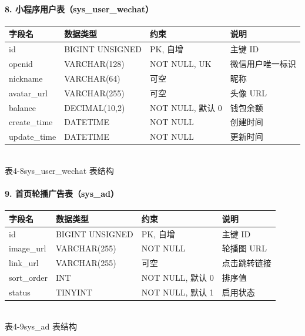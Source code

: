 \paragraph{8. 小程序用户表（sys\_user\_wechat）}
\begin{center}
  \renewcommand{\arraystretch}{1.4}
  \begin{tabular}{|>{\centering\arraybackslash}m{2.5cm}|>{\centering\arraybackslash}m{3.2cm}|>{\centering\arraybackslash}m{4.4cm}|>{\centering\arraybackslash}m{3.5cm}|}
    \hline
    \textbf{字段名} & \textbf{数据类型}   & \textbf{约束}    & \textbf{说明} \\ \hline
    id           & BIGINT UNSIGNED & PK, 自增         & 主键 ID       \\ \hline
    openid       & VARCHAR(128)    & NOT NULL, UK   & 微信用户唯一标识    \\ \hline
    nickname     & VARCHAR(64)     & 可空             & 昵称          \\ \hline
    avatar\_url  & VARCHAR(255)    & 可空             & 头像 URL      \\ \hline
    balance      & DECIMAL(10,2)   & NOT NULL, 默认 0 & 钱包余额        \\ \hline
    create\_time & DATETIME        & NOT NULL       & 创建时间        \\ \hline
    update\_time & DATETIME        & NOT NULL       & 更新时间        \\ \hline
  \end{tabular}
  \\[0.3em]
  {表4-8\quad sys\_user\_wechat 表结构}
\end{center}

\paragraph{9. 首页轮播广告表（sys\_ad）}
\begin{center}
  \renewcommand{\arraystretch}{1.4}
  \begin{tabular}{|>{\centering\arraybackslash}m{2.5cm}|>{\centering\arraybackslash}m{3.2cm}|>{\centering\arraybackslash}m{4.4cm}|>{\centering\arraybackslash}m{3.5cm}|}
    \hline
    \textbf{字段名} & \textbf{数据类型}   & \textbf{约束}    & \textbf{说明} \\ \hline
    id           & BIGINT UNSIGNED & PK, 自增         & 主键 ID       \\ \hline
    image\_url   & VARCHAR(255)    & NOT NULL       & 轮播图 URL     \\ \hline
    link\_url    & VARCHAR(255)    & 可空             & 点击跳转链接      \\ \hline
    sort\_order  & INT             & NOT NULL, 默认 0 & 排序值         \\ \hline
    status       & TINYINT         & NOT NULL, 默认 1 & 启用状态        \\ \hline
  \end{tabular}
  \\[0.3em]
  {表4-9\quad sys\_ad 表结构}
\end{center}

